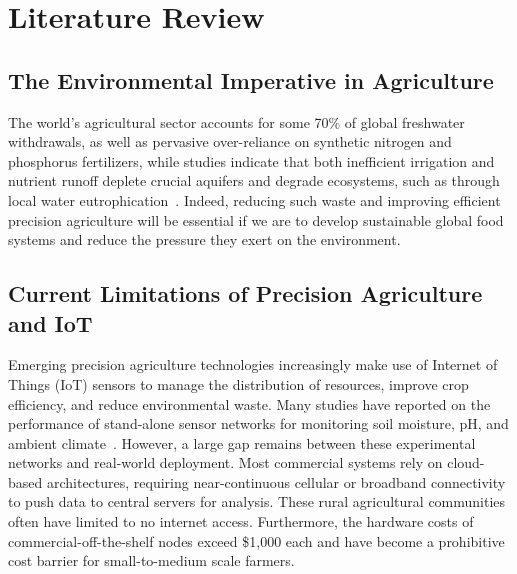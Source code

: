 \documentclass[10pt,twocolumn]{article}
\begin{document}
\section{Literature Review}

\subsection{The Environmental Imperative in Agriculture}
The world's agricultural sector accounts for some 70\% of global freshwater withdrawals, as well as pervasive over-reliance on synthetic nitrogen and phosphorus fertilizers, while studies indicate that both inefficient irrigation and nutrient runoff deplete crucial aquifers and degrade ecosystems, such as through local water eutrophication~\cite{ref11}.
Indeed, reducing such waste and improving efficient precision agriculture will be essential if we are to develop sustainable global food systems and reduce the pressure they exert on the environment.



\subsection{Current Limitations of Precision Agriculture and IoT}
Emerging precision agriculture technologies increasingly make use of Internet of Things (IoT) sensors to manage the distribution of resources, improve crop efficiency, and reduce environmental waste.
Many studies have reported on the performance of stand-alone sensor networks for monitoring soil moisture, pH, and ambient climate~\cite{ref5}.
However, a large gap remains between these experimental networks and real-world deployment.
Most commercial systems rely on cloud-based architectures, requiring near-continuous cellular or broadband connectivity to push data to central servers for analysis.
These rural agricultural communities often have limited to no internet access.
Furthermore, the hardware costs of commercial-off-the-shelf nodes exceed \$1,000 each and have become a prohibitive cost barrier for small-to-medium scale farmers.
\end{document}
